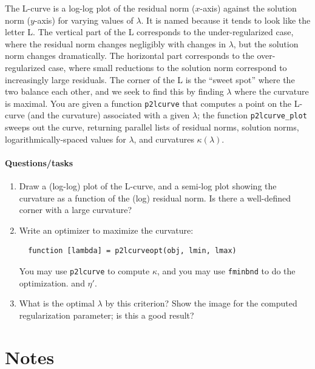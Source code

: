 \documentclass[12pt, leqno]{article} %
\begin{document}
The L-curve is a log-log plot of the residual norm ($x$-axis) against
the solution norm ($y$-axis) for varying values of $\lambda$.  It is
named because it tends to look like the letter L.  The vertical part of the L
corresponds to the under-regularized case, where the residual norm
changes negligibly with changes in $\lambda$, but the solution norm
changes dramatically.  The horizontal part corresponds to the
over-regularized case, where small reductions to the solution norm
correspond to increasingly large residuals.  The corner of the L is
the ``sweet spot'' where the two balance each other, and we seek to
find this by finding $\lambda$ where the curvature is maximal.
You are given a function {\tt p2lcurve} that computes a point on the
L-curve (and the curvature) associated with a given $\lambda$;
the function {\tt p2lcurve\_plot} sweeps out the curve, returning
parallel lists of residual norms, solution norms,
logarithmically-spaced values for $\lambda$, and
curvatures $\kappa(\lambda)$.

\paragraph*{Questions/tasks}
\begin{enumerate}
\item
  Draw a (log-log) plot of the L-curve, and a semi-log plot showing
  the curvature as a function of the (log) residual norm.  Is there
  a well-defined corner with a large curvature?
\item
  Write an optimizer to maximize the curvature:
\begin{lstlisting}
  function [lambda] = p2lcurveopt(obj, lmin, lmax)
\end{lstlisting}
  You may use {\tt p2lcurve} to compute $\kappa$, and you may
  use {\tt fminbnd} to do the optimization.
  and $\eta'$.
\item
  What is the optimal $\lambda$ by this criterion?
  Show the image for the computed regularization parameter;
  is this a good result?
\end{enumerate}

\section{Notes}
\end{document}
